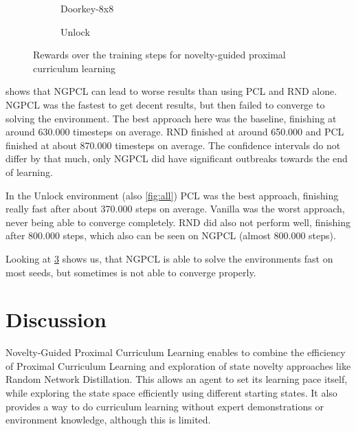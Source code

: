 \documentclass{article}
\begin{document}
\begin{figure}[ht]
  \begin{subfigure}{0.49\textwidth}
    
    \caption{Doorkey-8x8}
    \label{fig:comb:doorkey8}
  \end{subfigure}
  \begin{subfigure}{0.49\textwidth}
    
    \caption{Unlock}
    \label{fig:comb:unlock}
  \end{subfigure}
  \caption{Rewards over the training steps for novelty-guided proximal curriculum learning}
  \label{fig:comb}
\end{figure}

 shows that NGPCL can lead to worse results than using PCL and RND alone. NGPCL was the fastest to get decent results, but then failed to converge to solving the environment. The best approach here was the baseline, finishing at around 630.000 timesteps on average. RND finished at around 650.000 and PCL finished at about 870.000 timesteps on average. The confidence intervals do not differ by that much, only NGPCL did have significant outbreaks towards the end of learning.

In the Unlock environment (also \cref{fig:all}) PCL was the best approach, finishing really fast after about 370.000 steps on average. Vanilla was the worst approach, never being able to converge completely. RND did also not perform well, finishing after 800.000 steps, which also can be seen on NGPCL (almost 800.000 steps).

Looking at \cref{fig:comb} shows us, that NGPCL is able to solve the environments fast on most seeds, but sometimes is not able to converge properly.


\section{Discussion}
Novelty-Guided Proximal Curriculum Learning enables to combine the efficiency of Proximal Curriculum Learning and exploration of state novelty approaches like Random Network Distillation. This allows an agent to set its learning pace itself, while exploring the state space efficiently using different starting states. It also provides a way to do curriculum learning without expert demonstrations or environment knowledge, although this is limited.
\end{document}
